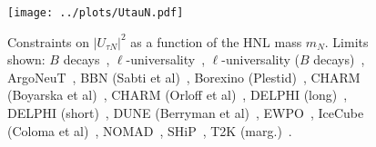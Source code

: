 \documentclass{revtex4-2}%
\begin{document}
%


\begin{figure}[h!]%
\centering%
\texttt{[image: ../plots/UtauN.pdf]}%
\caption{Constraints on $|U_{\tau N}|^2$ as a function of the HNL mass $m_N$. Limits shown: $B$ decays~\cite{Cvetic:2017gkt}, $\ell$-universality~\cite{Fernandez-Martinez:2016lgt}, $\ell$-universality ($B$ decays)~\cite{Cvetic:2017gkt}, ArgoNeuT~\cite{ArgoNeuT:2021clc}, BBN (Sabti et al)~\cite{Sabti:2020yrt}, Borexino (Plestid)~\cite{Plestid:2020ssy}, CHARM (Boyarska et al)~\cite{Boiarska:2021yho}, CHARM (Orloff et al)~\cite{Orloff:2002de}, DELPHI (long)~\cite{DELPHI:1996qcc}, DELPHI (short)~\cite{DELPHI:1996qcc}, DUNE (Berryman et al)~\cite{Berryman:2019dme}, EWPO~\cite{Bolton:2019pcu}, IceCube (Coloma et al)~\cite{Coloma:2017ppo}, NOMAD~\cite{NOMAD:2001eyx}, SHiP~\cite{SHiP:2018xqw}, T2K (marg.)~\cite{T2K:2019jwa}.}%
\end{figure}

%
%
%
\end{document}
